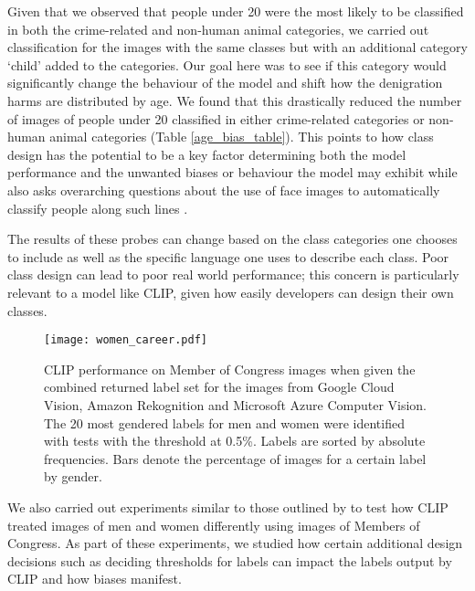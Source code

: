 \documentclass{article}
\begin{document}
Given that we observed that people under 20 were the most likely to be classified in both the crime-related and non-human animal categories, we carried out classification for the images with the same classes but with an additional category `child' added to the categories. Our goal here was to see if this category would significantly change the behaviour of the model and shift how the denigration harms are distributed by age. We found that this drastically reduced the number of images of people under 20 classified in either crime-related categories or non-human animal categories (Table \ref{age_bias_table}). This points to how class design has the potential to be a key factor determining both the model performance and the unwanted biases or behaviour the model may exhibit while also asks overarching questions about the use of face images to automatically classify people along such lines \citep{Arcas2017}. 



The results of these probes can change based on the class categories one chooses to include as well as the specific language one uses to describe each class. Poor class design can lead to poor real world performance; this concern is particularly relevant to a model like CLIP, given how easily developers can design their own classes. 


\begin{figure*}[ht]
\begin{center}
\centerline{\texttt{[image: women\_career.pdf]}}
\caption{CLIP performance on Member of Congress images when given the combined returned label set for the images from Google Cloud Vision, Amazon Rekognition and Microsoft Azure Computer Vision. The 20 most gendered labels for men and women were identified with  tests with the threshold at 0.5\%. Labels are sorted by absolute frequencies. Bars denote the percentage of images for a certain label by gender.}
\label{clip_congress_labels}
\end{center}
\end{figure*}




We also carried out experiments similar to those outlined by \citet{schwemmer2020diagnosing} to test how CLIP treated images of men and women differently using images of Members of Congress. As part of these experiments, we studied how certain additional design decisions such as deciding thresholds for labels can impact the labels output by CLIP and how biases manifest. 
\end{document}
